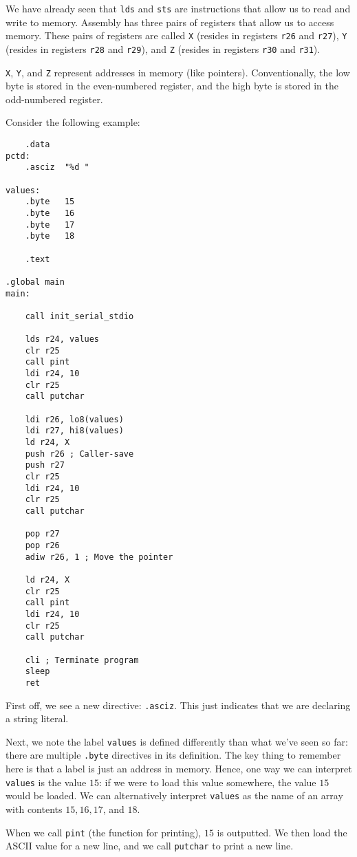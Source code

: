 We have already seen that \verb!lds! and \verb!sts! are instructions that allow us to read and write to memory. Assembly has three pairs of registers that allow us to access memory. These pairs of registers are called \verb!X! (resides in registers \verb!r26! and \verb!r27!), \verb!Y! (resides in registers \verb!r28! and \verb!r29!), and \verb!Z! (resides in registers \verb!r30! and \verb!r31!). 


\verb!X!, \verb!Y!, and \verb!Z! represent addresses in memory (like pointers). Conventionally, the low byte is stored in the even-numbered register, and the high byte is stored in the odd-numbered register. 


Consider the following example:

\begin{lstlisting}
    .data
pctd: 
    .asciz  "%d "

values:
    .byte   15
    .byte   16
    .byte   17
    .byte   18
    
    .text

.global main
main:

    call init_serial_stdio
    
    lds r24, values
    clr r25
    call pint
    ldi r24, 10
    clr r25
    call putchar
    
    ldi r26, lo8(values)
    ldi r27, hi8(values)
    ld r24, X
    push r26 ; Caller-save
    push r27
    clr r25
    ldi r24, 10
    clr r25
    call putchar
    
    pop r27
    pop r26
    adiw r26, 1 ; Move the pointer
    
    ld r24, X
    clr r25
    call pint
    ldi r24, 10
    clr r25
    call putchar
    
    cli ; Terminate program
    sleep 
    ret
\end{lstlisting}

First off, we see a new directive: \verb!.asciz!. This just indicates that we are declaring a string literal.

Next, we note the label \verb!values! is defined differently than what we've seen so far: there are multiple \verb!.byte! directives in its definition. The key thing to remember here is that a label is just an address in memory. Hence, one way we can interpret \verb!values! is the value $15$: if we were to load this value somewhere, the value $15$ would be loaded. We can alternatively interpret \verb!values! as the name of an array with contents $15, 16, 17$, and $18$.


When we call \verb!pint! (the function for printing), $15$ is outputted. We then load the ASCII value for a new line, and we call \verb!putchar! to print a new line. 

